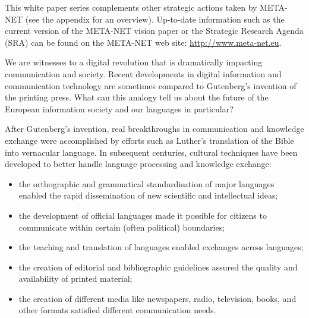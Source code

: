 \begin{multicols}{2}
This white paper series complements other strategic actions taken by META-NET (see the appendix for an overview). Up-to-date information such as the current version of the META-NET vision paper\cite{Meta1} or the Strategic Research Agenda (SRA) can be found on the META-NET web site: \url{http://www.meta-net.eu}.

\end{multicols}

\clearpage


\begin{multicols}{2}
We are witnesses to a digital revolution that is dramatically impacting communication and society. Recent developments in digital information and communication technology are sometimes compared to Gutenberg’s invention of the printing press. What can this analogy tell us about the future of the European information society and our languages in particular?


After Gutenberg’s invention, real breakthroughs in communication and knowledge exchange were accomplished by efforts such as Luther’s translation of the Bible into vernacular language. In subsequent centuries, cultural techniques have been developed to better handle language processing and knowledge exchange:

\begin{itemize}
\item the orthographic and grammatical standardisation of major languages enabled the rapid dissemination of new scientific and intellectual ideas;
\item the development of official languages made it possible for citizens to communicate within certain (often political) boundaries;
\item the teaching and translation of languages enabled exchanges across languages;
\item the creation of editorial and bibliographic guidelines assured the quality and availability of printed material;
\item the creation of different media like newspapers, radio, television, books, and other formats satisfied different communication needs. 
\end{itemize}


\end{multicols}
